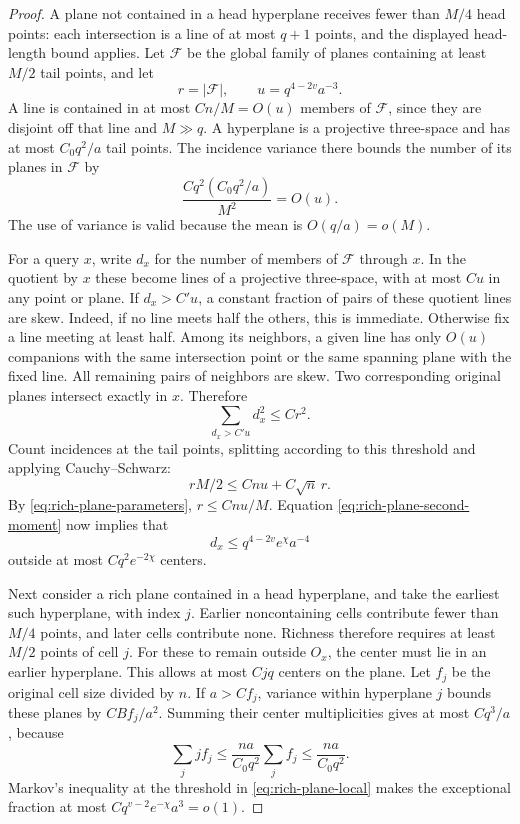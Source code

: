 \begin{proof}
A plane not contained in a head hyperplane receives fewer than $M/4$
head points: each intersection is a line of at most $q+1$ points, and
the displayed head-length bound applies.  Let $\mathcal F$ be the global
family of planes containing at least $M/2$ tail points, and let
\[
 r=|\mathcal F|,\qquad u=q^{4-2v}a^{-3}.
\]
A line is contained in at most $Cn/M=O(u)$ members of $\mathcal F$,
since they are disjoint off that line and $M\gg q$.  A hyperplane is
a projective three-space and has at most $C_0q^2/a$ tail
points.  The incidence variance there bounds the number of its planes in
$\mathcal F$ by
\[
 \frac{Cq^2(C_0q^2/a)}{M^2}=O(u).
\]
The use of variance is valid because the mean is $O(q/a)=o(M)$.

For a query $x$, write $d_x$ for the number of members of $\mathcal F$
through $x$.  In the quotient by $x$ these become lines of a projective
three-space, with at most $Cu$ in any point or plane.  If $d_x>C'u$, a
constant fraction of pairs of these quotient lines are skew.  Indeed,
if no line meets half the others, this is immediate.  Otherwise fix a
line meeting at least half.  Among its neighbors, a given line has only
$O(u)$ companions with the same intersection point or the same spanning
plane with the fixed line.  All remaining pairs of neighbors are skew.
Two corresponding original planes intersect exactly in $x$.  Therefore
\begin{equation}\label{eq:rich-plane-second-moment}
 \sum_{d_x>C'u}d_x^2\le Cr^2.
\end{equation}
Count incidences at the tail points, splitting according to this
threshold and applying Cauchy--Schwarz:
\[
 rM/2\le Cnu+C\sqrt n\,r.
\]
By \eqref{eq:rich-plane-parameters}, $r\le Cnu/M$.  Equation
\eqref{eq:rich-plane-second-moment} now implies that
\begin{equation}\label{eq:rich-plane-local}
 d_x\le q^{4-2v}e^\chi a^{-4}
\end{equation}
outside at most $Cq^2e^{-2\chi}$ centers.

Next consider a rich plane contained in a head hyperplane, and take the
earliest such hyperplane, with index $j$.  Earlier noncontaining cells
contribute fewer than $M/4$ points, and later cells contribute none.
Richness therefore requires at least $M/2$ points of cell $j$.
For these to remain outside $O_x$, the center must lie in an earlier
hyperplane.  This allows at most $Cjq$ centers on the plane.
Let $f_j$ be the original cell size divided by $n$.  If $a>Cf_j$,
variance within hyperplane $j$ bounds these planes by $CBf_j/a^2$.
Summing their center multiplicities gives at most $Cq^3/a$, because
\[
 \sum_j j f_j\le \frac{na}{C_0q^2}\sum_j f_j
 \le\frac{na}{C_0q^2}.
\]
Markov's inequality at the threshold in \eqref{eq:rich-plane-local}
makes the exceptional fraction at most $Cq^{v-2}e^{-\chi}a^3=o(1)$.


\end{proof}
